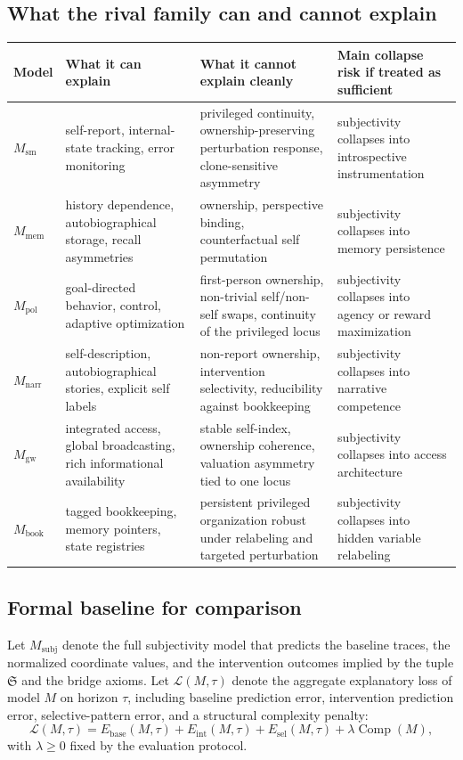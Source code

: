 \documentclass[11pt,a4paper]{article}
\theoremstyle{definition}
\newcommand{\Substate}{\mathfrak{S}}
\newcommand{\Loss}{\mathcal{L}}
\newcommand{\Comp}{\operatorname{Comp}}
\begin{document}
\subsection{What the rival family can and cannot explain}
\begin{table}[t]
\small
\begin{tabularx}{\textwidth}{@{}p{}p{}p{}Y@{}}
\toprule
\textbf{Model} & \textbf{What it can explain} & \textbf{What it cannot explain cleanly} & \textbf{Main collapse risk if treated as sufficient} \\
\midrule
$M_{\mathrm{sm}}$ & self-report, internal-state tracking, error monitoring & privileged continuity, ownership-preserving perturbation response, clone-sensitive asymmetry & subjectivity collapses into introspective instrumentation \\
$M_{\mathrm{mem}}$ & history dependence, auto\-bio\-graphical storage, recall asymmetries & ownership, perspective binding, counterfactual self permutation & subjectivity collapses into memory persistence \\
$M_{\mathrm{pol}}$ & goal-directed behavior, control, adaptive optimization & first-person ownership, non-trivial self/non-self swaps, continuity of the privileged locus & subjectivity collapses into agency or reward maximization \\
$M_{\mathrm{narr}}$ & self-description, auto\-bio\-graphical stories, explicit self labels & non-report ownership, intervention selectivity, reducibility against bookkeeping & subjectivity collapses into narrative competence \\
$M_{\mathrm{gw}}$ & integrated access, global broadcasting, rich informational availability & stable self-index, ownership coherence, valuation asymmetry tied to one locus & subjectivity collapses into access architecture \\
$M_{\mathrm{book}}$ & tagged bookkeeping, memory pointers, state registries & persistent privileged organization robust under relabeling and targeted perturbation & subjectivity collapses into hidden variable relabeling \\
\bottomrule
\end{tabularx}
\end{table}

\subsection{Formal baseline for comparison}
Let $M_{\mathrm{subj}}$ denote the full subjectivity model that predicts the baseline traces, the normalized coordinate values, and the intervention outcomes implied by the tuple $\Substate$ and the bridge axioms. Let $\Loss(M,\tau)$ denote the aggregate explanatory loss of model $M$ on horizon $\tau$, including baseline prediction error, intervention prediction error, selective-pattern error, and a structural complexity penalty:
\[
\Loss(M,\tau)=E_{\mathrm{base}}(M,\tau)+E_{\mathrm{int}}(M,\tau)+E_{\mathrm{sel}}(M,\tau)+\lambda \Comp(M),
\]
with $\lambda\ge 0$ fixed by the evaluation protocol.
\end{document}
